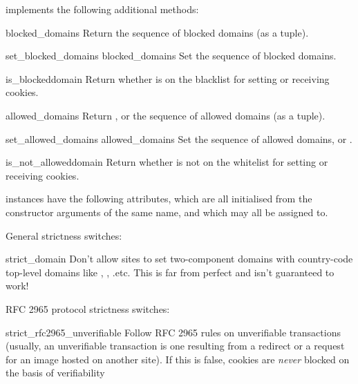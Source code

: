  implements the following additional
methods:

\begin{methoddesc}[DefaultCookiePolicy]{blocked_domains}{}
Return the sequence of blocked domains (as a tuple).
\end{methoddesc}

\begin{methoddesc}[DefaultCookiePolicy]{set_blocked_domains}
  {blocked_domains}
Set the sequence of blocked domains.
\end{methoddesc}

\begin{methoddesc}[DefaultCookiePolicy]{is_blocked}{domain}
Return whether  is on the blacklist for setting or
receiving cookies.
\end{methoddesc}

\begin{methoddesc}[DefaultCookiePolicy]{allowed_domains}{}
Return , or the sequence of allowed domains (as a tuple).
\end{methoddesc}

\begin{methoddesc}[DefaultCookiePolicy]{set_allowed_domains}
  {allowed_domains}
Set the sequence of allowed domains, or .
\end{methoddesc}

\begin{methoddesc}[DefaultCookiePolicy]{is_not_allowed}{domain}
Return whether  is not on the whitelist for setting or
receiving cookies.
\end{methoddesc}

 instances have the following attributes,
which are all initialised from the constructor arguments of the same
name, and which may all be assigned to.

General strictness switches:

\begin{memberdesc}{strict_domain}
Don't allow sites to set two-component domains with country-code
top-level domains like , ,
.etc.  This is far from perfect and isn't guaranteed to
work!
\end{memberdesc}

RFC 2965 protocol strictness switches:

\begin{memberdesc}{strict_rfc2965_unverifiable}
Follow RFC 2965 rules on unverifiable transactions (usually, an
unverifiable transaction is one resulting from a redirect or a request
for an image hosted on another site).  If this is false, cookies are
\emph{never} blocked on the basis of verifiability
\end{memberdesc}

